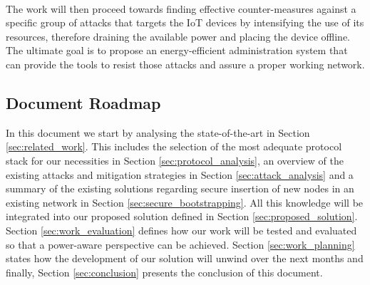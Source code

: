 \paragraph{}
The work will then proceed towards finding effective counter-measures against a specific group of attacks that targets the \ac{IoT} devices by intensifying the use of its resources, therefore draining the available power and placing the device offline. The ultimate goal is to propose an energy-efficient administration system that can provide the tools to resist those attacks and assure a proper working network.

\subsection{Document Roadmap}

In this document we start by analysing the state-of-the-art in Section \ref{sec:related_work}. This includes the selection of the most adequate protocol stack for our necessities in Section \ref{sec:protocol_analysis}, an overview of the existing attacks and mitigation strategies in Section \ref{sec:attack_analysis} and a summary of the existing solutions regarding secure insertion of new nodes in an existing network in Section \ref{sec:secure_bootstrapping}. All this knowledge will be integrated into our proposed solution defined in Section \ref{sec:proposed_solution}. Section \ref{sec:work_evaluation} defines how our work will be tested and evaluated so that a power-aware perspective can be achieved. Section \ref{sec:work_planning} states how the development of our solution will unwind over the next months and finally, Section \ref{sec:conclusion} presents the conclusion of this document.